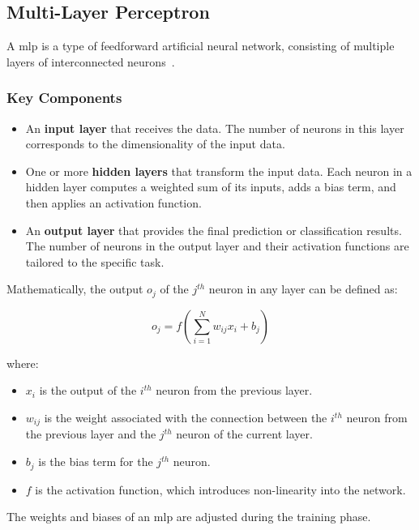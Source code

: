 \subsection{Multi-Layer Perceptron}

A \gls{mlp} is a type of feedforward artificial neural network, consisting of multiple layers of interconnected neurons~\cite{goodfellow2016deep}.

\subsubsection{Key Components}

\begin{itemize}
	\item An \textbf{input layer} that receives the data. The number of neurons in this layer corresponds to the dimensionality of the input data.
	
	\item One or more \textbf{hidden layers} that transform the input data. Each neuron in a hidden layer computes a weighted sum of its inputs, adds a bias term, and then applies an activation function.
	
	\item An \textbf{output layer} that provides the final prediction or classification results. The number of neurons in the output layer and their activation functions are tailored to the specific task.
\end{itemize}

Mathematically, the output \( o_{j} \) of the \( j^{th} \) neuron in any layer can be defined as:

\[
o_{j} = f\left( \sum_{i=1}^{N} w_{ij} x_{i} + b_{j} \right)
\]

where:
\begin{itemize}
	\item \( x_{i} \) is the output of the \( i^{th} \) neuron from the previous layer.
	\item \( w_{ij} \) is the weight associated with the connection between the \( i^{th} \) neuron from the previous layer and the \( j^{th} \) neuron of the current layer.
	\item \( b_{j} \) is the bias term for the \( j^{th} \) neuron.
	\item \( f \) is the activation function, which introduces non-linearity into the network.
\end{itemize}

The weights and biases of an \gls{mlp} are adjusted during the training phase.


